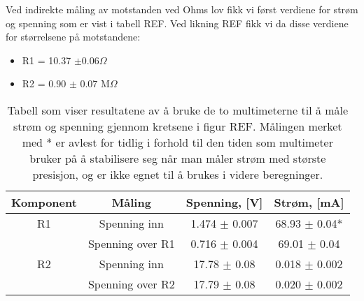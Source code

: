 \documentclass[reprint, english,notitlepage]{revtex4-1}  %
\begin{document}
Ved indirekte måling av motstanden ved Ohms lov fikk vi først verdiene for strøm og spenning som er vist i tabell REF. Ved likning REF fikk vi da disse verdiene for størrelsene på motstandene:
\begin{itemize}
  \item R1 = 10.37 $\pm 0.06 \Omega$
  \item R2 = 0.90 $\pm$ 0.07 M$\Omega$
\end{itemize}

\begin{table}[p]
\label{fig:tabell_motstander}
\caption{Tabell som viser resultatene av å bruke de to multimeterne til å måle strøm og spenning gjennom kretsene i figur REF. Målingen merket med * er avlest for tidlig i forhold til den tiden som multimeter bruker på å stabilisere seg når man måler strøm med største presisjon, og er ikke egnet til å brukes i videre beregninger.}

\begin{adjustbox}{width=\linewidth}
\begin{tabular}{||c | c | c | c||}
\hline
Komponent & Måling & Spenning, [V] & Strøm, [mA]   \\ \hline\hline
R1 & Spenning inn     & 1.474 $\pm$ 0.007 & 68.93 $\pm$ 0.04*   \\ \hline
   & Spenning over R1 & 0.716 $\pm$ 0.004 & 69.01 $\pm$ 0.04    \\ \hline
R2 & Spenning inn     & 17.78 $\pm$ 0.08  & 0.018 $\pm$ 0.002   \\ \hline
   & Spenning over R2 & 17.79 $\pm$ 0.08  & 0.020 $\pm$ 0.002   \\ \hline
\end{tabular}
\end{adjustbox}
\end{table}
\end{document}
